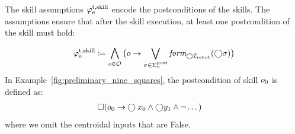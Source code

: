 \documentclass[letterpaper, 10 pt, conference]{ieeeconf}
\begin{document}
The skill assumptions $\varphi_\textrm{e}^\textrm{t,skill}$ encode the postconditions of the skills. 
The assumptions ensure that after the skill execution, 
at least one postcondition of the skill must hold:

\begin{equation}\label{eq:env_trans}
\begin{aligned}
    \varphi_\textrm{e}^\textrm{t,skill} \coloneqq \bigwedge_{o \in \mathcal{O}} \big( o 
    \to
    \bigvee_{\sigma\in\Sigma_{o}^{\textrm{post}}} \textit{form}_{\bigcirc{\mathcal I}_{\textrm{robot}}}(\bigcirc\sigma) \big)
\end{aligned}
\end{equation}
%
In Example~\ref{fig:preliminary_nine_squares},
the postcondition of skill $o_{0}$
is defined as:
\begin{equation}\label{eq:skill_0_post}
\begin{aligned}
     \square (o_{0} 
    \to &\bigcirc x_0 \land \bigcirc y_1 \land \neg \dots)
\end{aligned}
\end{equation}
where we omit the centroidal inputs that are False.
\end{document}
